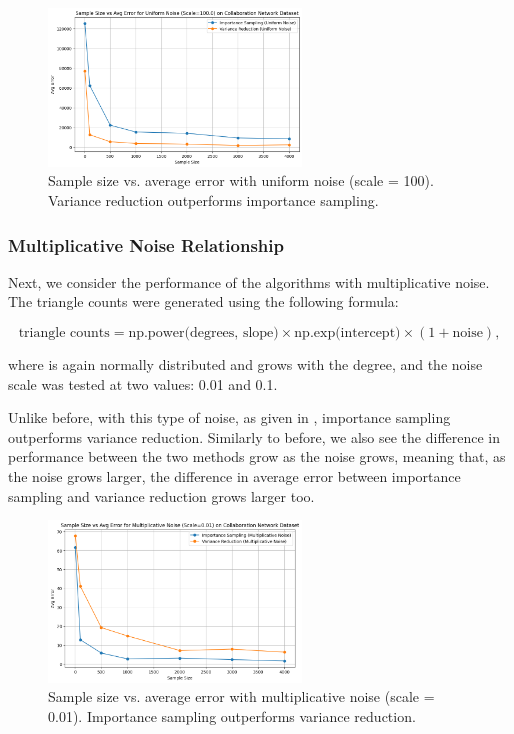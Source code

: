 \documentclass[11pt, margin=1in]{article}
\begin{document}
\begin{figure}[H]
    \centering
    \includegraphics[width=0.6\textwidth]{plots/simulated/percent_error_vs_sample_size_comparison_uniform_100.0.png}
    \caption{Sample size vs. average error with uniform noise (scale = 100). Variance reduction outperforms importance sampling.}
    \label{fig:uniform_noise_100}
\end{figure}

\subsubsection{Multiplicative Noise Relationship}

Next, we consider the performance of the algorithms with multiplicative noise. The triangle counts were generated using the following formula:

\[
\text{triangle counts} = \text{np.power(degrees, slope)} \times \text{np.exp(intercept)} \times (1 + \text{noise}),
\]

where  is again normally distributed and grows with the degree, and the noise scale was tested at two values: 0.01 and 0.1.

Unlike before, with this type of noise, as given in , importance sampling outperforms variance reduction.
Similarly to before, we also see the difference in performance between the two methods grow as the noise grows, meaning that, as the noise grows larger, the difference in average error between importance sampling and variance reduction grows larger too.

\begin{figure}[H]
    \centering
    \includegraphics[width=0.6\textwidth]{plots/simulated/percent_error_vs_sample_size_comparison_multiplicative_0.01.png}
    \caption{Sample size vs. average error with multiplicative noise (scale = 0.01). Importance sampling outperforms variance reduction.}
    \label{fig:multiplicative_noise_001}
\end{figure}
\end{document}
